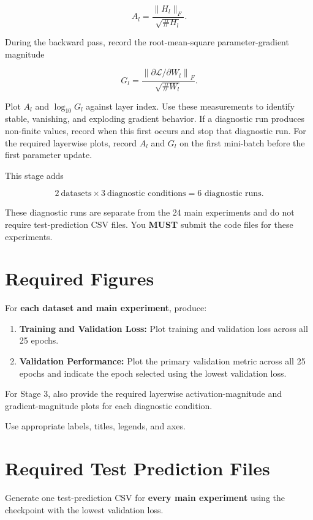 \documentclass[11pt,a4paper]{article}
\begin{document}
\[
A_l=\frac{\|H_l\|_F}{\sqrt{\# H_l}}.
\]

During the backward pass, record the root-mean-square parameter-gradient magnitude

\[
G_l=
\frac{\left\|\partial\mathcal{L}/\partial W_l\right\|_F}
{\sqrt{\# W_l}}.
\]

Plot $A_l$ and $\log_{10}G_l$ against layer index. Use these measurements to identify stable, vanishing, and exploding gradient behavior. If a diagnostic run produces non-finite values, record when this first occurs and stop that diagnostic run. For the required layerwise plots, record $A_l$ and $G_l$ on the first mini-batch before the first parameter update.

This stage adds

\[
2\ \text{datasets}\times3\ \text{diagnostic conditions}
=\boxed{6\text{ diagnostic runs}}.
\]

These diagnostic runs are separate from the 24 main experiments and do not require test-prediction CSV files. You \textbf{MUST} submit the code files for these experiments.

\section{Required Figures}

For \textbf{each dataset and main experiment}, produce:

\begin{enumerate}
    \item \textbf{Training and Validation Loss:} Plot training and validation loss across all 25 epochs.
    \item \textbf{Validation Performance:} Plot the primary validation metric across all 25 epochs and indicate the epoch selected using the lowest validation loss.
\end{enumerate}

For Stage 3, also provide the required layerwise activation-magnitude and gradient-magnitude plots for each diagnostic condition.

Use appropriate labels, titles, legends, and axes.

\section{Required Test Prediction Files}

Generate one test-prediction CSV for \textbf{every main experiment} using the checkpoint with the lowest validation loss.
\end{document}
